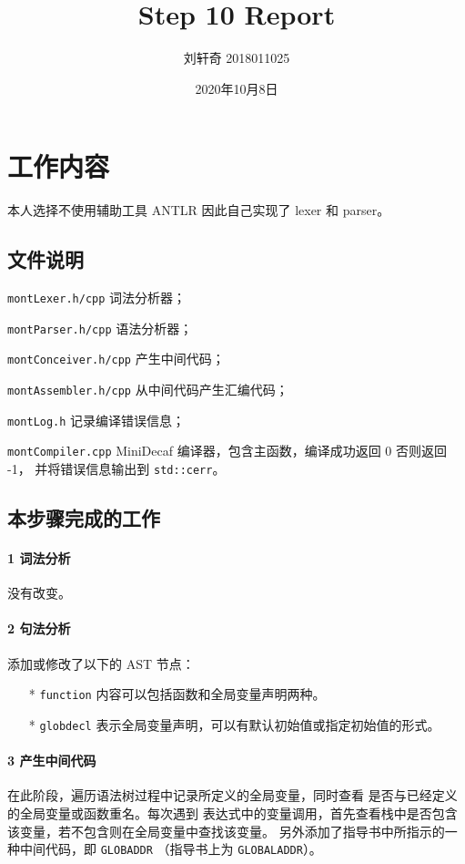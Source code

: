 \documentclass[UTF8]{ctexart}
\title{Step 10 Report}
\author{刘轩奇 2018011025}
\date{2020年10月8日}
\newcommand{\T}[1]{\texttt{{#1}}}
\begin{document}
    \maketitle
    \section{工作内容}
        本人选择不使用辅助工具 ANTLR 因此自己实现了 lexer 和 parser。
        \subsection{文件说明} 
            \T{montLexer.h/cpp} 词法分析器；

            \T{montParser.h/cpp} 语法分析器；

            \T{montConceiver.h/cpp} 产生中间代码；

            \T{montAssembler.h/cpp} 从中间代码产生汇编代码；
            
            \T{montLog.h} 记录编译错误信息；

            \T{montCompiler.cpp} MiniDecaf 编译器，包含主函数，编译成功返回 0 否则返回 -1，
            并将错误信息输出到 \T{std::cerr}。
        
        \subsection{本步骤完成的工作}

            \paragraph{1 词法分析} 没有改变。

            \paragraph{2 句法分析} 添加或修改了以下的 AST 节点：
            \begin{itemize}
                \item[*] \T{function} 内容可以包括函数和全局变量声明两种。
                \item[*] \T{globdecl} 表示全局变量声明，可以有默认初始值或指定初始值的形式。
            \end{itemize}

            \paragraph{3 产生中间代码} 在此阶段，遍历语法树过程中记录所定义的全局变量，同时查看
            是否与已经定义的全局变量或函数重名。每次遇到
            表达式中的变量调用，首先查看栈中是否包含该变量，若不包含则在全局变量中查找该变量。
            另外添加了指导书中所指示的一种中间代码，即 \T{GLOBADDR} （指导书上为 \T{GLOBALADDR}）。
\end{document}
